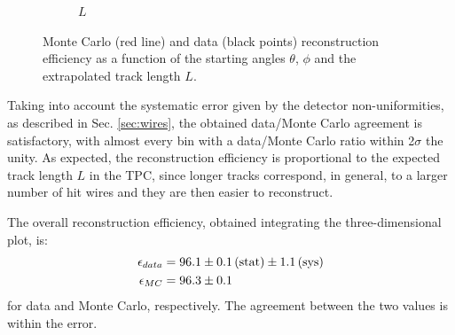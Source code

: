 \documentclass[a4paper]{scrartcl}
\begin{document}
\begin{figure}[htbp]
\begin{subfigure}{0.33\textwidth}
    \caption{$L$} \label{fig:l}
  \end{subfigure}
  \caption{Monte Carlo (red line) and data (black points) reconstruction efficiency as a function of the starting angles $\theta$, $\phi$ and the extrapolated track length $L$.}\label{fig:1d}
\end{figure}

Taking into account the systematic error given by the detector non-uniformities, as described in Sec. \ref{sec:wires}, the obtained data/Monte Carlo agreement is satisfactory, with almost every bin with a data/Monte Carlo ratio within 2$\sigma$ the unity. As expected, the reconstruction efficiency is proportional to the expected track length $L$ in the TPC, since longer tracks correspond, in general, to a larger number of hit wires and they are then easier to reconstruct.

The overall reconstruction efficiency, obtained integrating the three-dimensional plot, is:
\begin{align*}
\epsilon_{data} &= 96.1 \pm 0.1\thinspace\mathrm{(stat)} \pm 1.1\thinspace\mathrm{(sys)} \\
\epsilon_{MC} &= 96.3 \pm 0.1
\end{align*} for data and Monte Carlo, respectively. The agreement between the two values is within the error.
\end{document}
